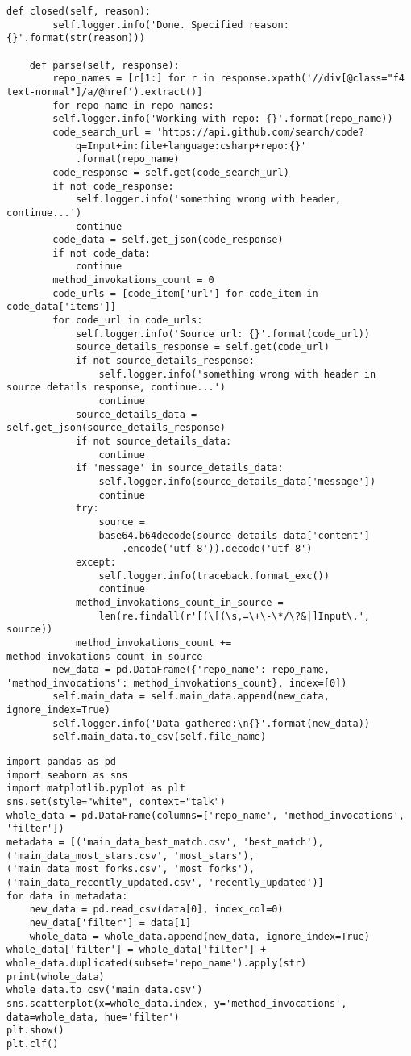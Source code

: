 \begin{lstlisting}[caption={Исходный код класса обработки веб-страниц проектов с сайта GitHub.com},label=spider]
	def closed(self, reason):
		self.logger.info('Done. Specified reason: {}'.format(str(reason)))
	
	def parse(self, response):
		repo_names = [r[1:] for r in response.xpath('//div[@class="f4 text-normal"]/a/@href').extract()]
		for repo_name in repo_names:
		self.logger.info('Working with repo: {}'.format(repo_name))
		code_search_url = 'https://api.github.com/search/code?
			q=Input+in:file+language:csharp+repo:{}'
			.format(repo_name)
		code_response = self.get(code_search_url)
		if not code_response:
			self.logger.info('something wrong with header, continue...')
			continue
		code_data = self.get_json(code_response)
		if not code_data:
			continue
		method_invokations_count = 0
		code_urls = [code_item['url'] for code_item in code_data['items']]
		for code_url in code_urls:
			self.logger.info('Source url: {}'.format(code_url))
			source_details_response = self.get(code_url)
			if not source_details_response:
				self.logger.info('something wrong with header in source details response, continue...')
				continue
			source_details_data = self.get_json(source_details_response)
			if not source_details_data:
				continue
			if 'message' in source_details_data:
				self.logger.info(source_details_data['message'])
				continue
			try:
				source = 
				base64.b64decode(source_details_data['content']
					.encode('utf-8')).decode('utf-8')
			except:
				self.logger.info(traceback.format_exc())
				continue
			method_invokations_count_in_source = 
				len(re.findall(r'[(\[(\s,=\+\-\*/\?&|]Input\.', source))
			method_invokations_count += method_invokations_count_in_source
		new_data = pd.DataFrame({'repo_name': repo_name, 'method_invocations': method_invokations_count}, index=[0])
		self.main_data = self.main_data.append(new_data, ignore_index=True)
		self.logger.info('Data gathered:\n{}'.format(new_data))
		self.main_data.to_csv(self.file_name)
\end{lstlisting}

\begin{lstlisting}[caption={Утилита для сбора собранных spider-программой данных воедино},label=form_main_data]
import pandas as pd
import seaborn as sns
import matplotlib.pyplot as plt
sns.set(style="white", context="talk")
whole_data = pd.DataFrame(columns=['repo_name', 'method_invocations', 'filter'])
metadata = [('main_data_best_match.csv', 'best_match'),
('main_data_most_stars.csv', 'most_stars'),
('main_data_most_forks.csv', 'most_forks'),
('main_data_recently_updated.csv', 'recently_updated')]
for data in metadata:
	new_data = pd.read_csv(data[0], index_col=0)
	new_data['filter'] = data[1]
	whole_data = whole_data.append(new_data, ignore_index=True)
whole_data['filter'] = whole_data['filter'] + whole_data.duplicated(subset='repo_name').apply(str)
print(whole_data)
whole_data.to_csv('main_data.csv')
sns.scatterplot(x=whole_data.index, y='method_invocations', data=whole_data, hue='filter')
plt.show()
plt.clf()
\end{lstlisting}

